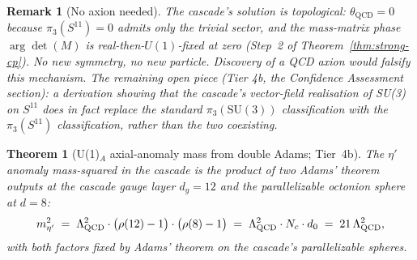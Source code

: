 \documentclass[12pt,a4paper]{article}
\newtheorem{theorem}{Theorem}[section]
\newtheorem*{remark}{Remark}
\begin{document}
\begin{remark}[No axion needed]
The cascade's solution is topological: $\theta_{\text{QCD}} = 0$ because $\pi_3(S^{11}) = 0$ admits only the trivial sector, and the mass-matrix phase $\arg\det(M)$ is real-then-$U(1)$-fixed at zero (Step~2 of Theorem~\ref{thm:strong-cp}). No new symmetry, no new particle. Discovery of a QCD axion would falsify this mechanism. The remaining open piece (Tier 4b, the Confidence Assessment section): a derivation showing that the cascade's vector-field realisation of SU(3) on $S^{11}$ does in fact replace the standard $\pi_3(\text{SU}(3))$ classification with the $\pi_3(S^{11})$ classification, rather than the two coexisting.
\end{remark}


\begin{theorem}[U(1)$_A$ axial-anomaly mass from double Adams; Tier~4b]\label{thm:axial-anomaly-mass}
The $\eta'$ anomaly mass-squared in the cascade is the product of two
Adams' theorem outputs at the cascade gauge layer $d_g=12$ and the
parallelizable octonion sphere at $d=8$:
\begin{equation}\label{eq:axial-anomaly-mass}
m_{\eta'}^2 \;=\; \Lambda_{\rm QCD}^2 \cdot \bigl(\rho(12)-1\bigr) \cdot \bigl(\rho(8)-1\bigr) \;=\; \Lambda_{\rm QCD}^2 \cdot N_c \cdot d_0 \;=\; 21\,\Lambda_{\rm QCD}^2,
\end{equation}
with both factors fixed by Adams' theorem on the cascade's parallelizable spheres.
\end{theorem}
\end{document}
